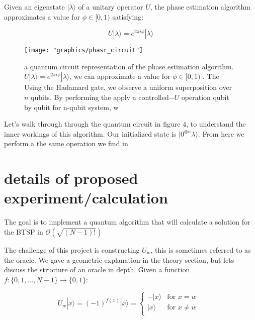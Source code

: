 \documentclass[twocolumn,showpacs,preprintnumbers,amsmath,amssymb]{revtex4}
\begin{document}
		  Given an eigenstate $|\lambda \rangle$ of a unitary operator $U$, the phase estimation algorithm approximates a value for $\phi \in [0,1)$ satisfying:
		
		\begin{equation}
		 U |\lambda \rangle = e^{2\pi i \phi} |\lambda \rangle
	    \end{equation}
		\begin{figure}[!h]
			\centering
			\texttt{[image: "graphics/phasr\_circuit"]}
			\caption{a quantum circuit representation of the phase estimation algorithm. $ U |\lambda \rangle = e^{2\pi i \phi} |\lambda \rangle $, we can  approximate a value for $\phi \in [0,1)$ . The  Using the Hadamard gate, we observe a uniform superposition over $n$ qubits. By performing the apply a controlled$-U$ operation qubit by qubit for n-qubit system, w}
			\label{fig:phasrcircuit}
		\end{figure}
		
		
		Let's walk through through the quantum circuit in figure 4, to understand the inner workings of this algorithm.	 Our initialized state is $|0^{\otimes n} \lambda\rangle$. From here we perform a the same operation we find in 
		
		
		
		\section{details of proposed experiment/calculation}
		
		The goal is to implement a quantum algorithm that will calculate a solution for the BTSP in $\mathcal{O}(\sqrt{(N-1)!})$
		
		The challenge of this project is constructing $U_w$, this is sometimes referred to as the oracle. We gave a geometric explanation in the theory section, but lets discuss the structure of an oracle in depth. Given a function $f: \{0,1,...,N-1\} \rightarrow \{0,1\}$:
		
		\begin{equation}
			U_{w}|x\rangle = (-1)^{f(x)}|x\rangle = 
			\begin{cases}
				-|x\rangle & \text{for  $x=w$ }\\
				|x\rangle  & \text{for $x\neq w$}\\
			\end{cases}       
		\end{equation}
		
\end{document}
